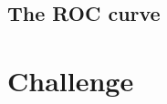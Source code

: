 \documentclass[11pt, answers]{exam}
\begin{document}
  \subsection{The ROC curve}%
  \label{sub:the_roc_curve}

  \begin{solution}
  \end{solution}

  \section{Challenge}%
  \label{sec:challenge}

  \begin{solution}
  \end{solution}
\end{document}
